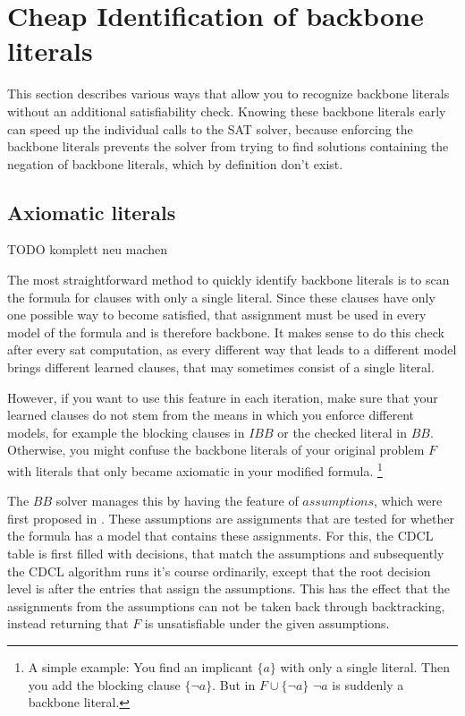 \section{Cheap Identification of backbone literals}
This section describes various ways that allow you to recognize backbone literals without an additional satisfiability check. Knowing these backbone literals early can speed up the individual calls to the SAT solver, because enforcing the backbone literals prevents the solver from trying to find solutions containing the negation of backbone literals, which by definition don't exist.



\subsection{Axiomatic literals}

TODO komplett neu machen

The most straightforward method to quickly identify backbone literals is to scan the formula for clauses with only a single literal. Since these clauses have only one possible way to become satisfied, that assignment must be used in every model of the formula and is therefore backbone. It makes sense to do this check after every sat computation, as every different way that leads to a different model brings different learned clauses, that may sometimes consist of a single literal.

However, if you want to use this feature in each iteration, make sure that your learned clauses do not stem from the means in which you enforce different models, for example the blocking clauses in $IBB$ or the checked literal in $BB$. Otherwise, you might confuse the backbone literals of your original problem $F$ with literals that only became axiomatic in your modified formula. \footnote{A simple example: You find an implicant $\{a\}$ with only a single literal. Then you add the blocking clause $\{\neg a\}$. But in $F \cup \{\neg a\}$ $\neg a$ is suddenly a backbone literal.}

The $BB$ solver manages this by having the feature of $assumptions$, which were first proposed in \cite{ENSO03}. These assumptions are assignments that are tested for whether the formula has a model that contains these assignments. For this, the CDCL table is first filled with decisions, that match the assumptions and subsequently the CDCL algorithm runs it's course ordinarily, except that the root decision level is after the entries that assign the assumptions. This has the effect that the assignments from the assumptions can not be taken back through backtracking, instead returning that $F$ is unsatisfiable under the given assumptions.

